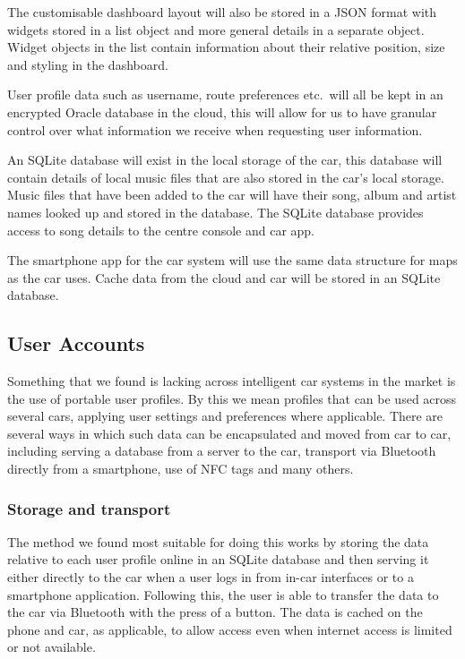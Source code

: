 \documentclass{article}
\begin{document}
The customisable dashboard layout will also be stored in a JSON format with widgets stored in a list object and more general details in a separate object. Widget objects in the list contain information about their relative position, size and styling in the dashboard.

User profile data such as username, route preferences etc.\ will all be kept in an encrypted Oracle database in the cloud, this will allow for us to have granular control over what information we receive when requesting user information.

An SQLite database will exist in the local storage of the car, this database will contain details of local music files that are also stored in the car's local storage. Music files that have been added to the car will have their song, album and artist names looked up and stored in the database. The SQLite database provides access to song details to the centre console and car app.

The smartphone app for the car system will use the same data structure for maps as the car uses. Cache data from the cloud and car will be stored in an SQLite database.

\subsection{User Accounts}\label{ssec:user-accounts} %
Something that we found is lacking across intelligent car systems in the market is the use of portable user profiles. By this we mean profiles that can be used across several cars, applying user settings and preferences where applicable.
There are several ways in which such data can be encapsulated and moved from car to car, including serving a database from a server to the car, transport via Bluetooth directly from a smartphone, use of NFC tags and many others.
\subsubsection{Storage and transport}
The method we found most suitable for doing this works by storing the data relative to each user profile online in an SQLite database and then serving it either directly to the car when a user logs in from in-car interfaces or to a smartphone application. Following this, the user is able to transfer the data to the car via Bluetooth with the press of a button. The data is cached on the phone and car, as applicable, to allow access even when internet access is limited or not available.
\end{document}
